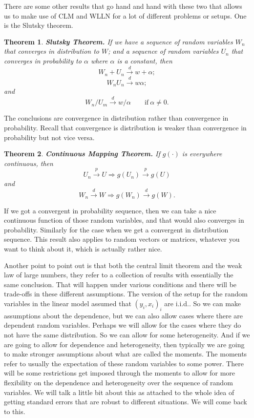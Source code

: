 \documentclass[11pt,a4paper]{amsart}
\theoremstyle{plain}
\newtheorem{theorem}{Theorem}
\theoremstyle{definition}
\begin{document}
	There are some other results that go hand and hand with these two that allows us to make use of CLM and WLLN for a lot of different problems or setups. One is the Slutsky theorem.
	\begin{theorem}\label{slutsky}
		\textbf{Slutsky Theorem.} If we have a sequence of random variables $W_{n}$ that converges in distribution to $W$; and a sequence of random variables $U_{n}$ that converges in probability to $\alpha$ where $\alpha$ is a constant, then 
		\[	W_{n} + U_{n} \stackrel{d}{\longrightarrow} w + \alpha;	\]
		\[	W_{n}U_{n} \stackrel{d}{\longrightarrow} w\alpha;	\]
		and 
		\[	W_{n}/U_{m} \stackrel{d}{\longrightarrow} w/\alpha \qquad \text{if}~ \alpha \ne 0.	\]
	\end{theorem}
	The conclusions are convergence in distribution rather than convergence in probability. Recall that convergence is distribution is weaker than convergence in probability but not vice versa. 
	\begin{theorem}
		\textbf{Continuous Mapping Theorem.} If $g(\cdot)$ is everywhere continuous, then 
		\[	U_{n} \xrightarrow{p} U \Rightarrow g(U_{n}) \xrightarrow{p} g(U)	\]
		and
		\[	W_{n} \xrightarrow{d} W \Rightarrow g(W_{n}) \xrightarrow{d} g(W).	\]
	\end{theorem}
	If we got a convergent in probability sequence, then we can take a nice continuous function of those random variables, and that would also converges in probability. Similarly for the case when we get a convergent in distribution sequence. This result also applies to random vectors or matrices, whatever you want to think about it, which is actually rather nice.\par 
	Another point to point out is that both the central limit theorem and the weak law of large numbers, they refer to a collection of results with essentially the same conclusion. That will happen under various conditions and there will be trade-offs in these different assumptions. The version of the setup for the random variables in the linear model assumed that $(y_{i}, x_{i})_{i}$ are i.i.d.. So we can make assumptions about the dependence, but we can also allow cases where there are dependent random variables. Perhaps we will allow for the cases where they do not have the same distribution. So we can allow for some heterogeneity. And if we are going to allow for dependence and heterogeneity, then typically we are going to make stronger assumptions about what are called the moments. The moments refer to usually the expectation of these random variables to some power. There will be some restrictions get imposed through the moments to allow for more flexibility on the dependence and heterogeneity over the sequence of random variables. We will talk a little bit about this as attached to the whole idea of getting standard errors that are robust to different situations. We will come back to this.\par 
\end{document}
